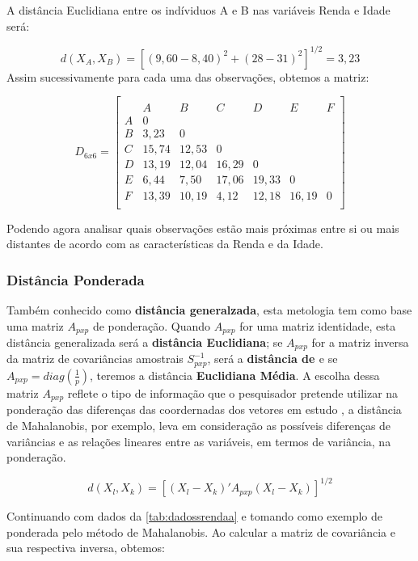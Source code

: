 \documentclass[
]{book}
\begin{document}
A distância Euclidiana entre os indíviduos A e B nas variáveis Renda e Idade será:

\[d(X_A,X_B)=[(9,60-8,40)^2+(28-31)^2]^{1/2}=3,23\]
Assim sucessivamente para cada uma das observações, obtemos a matriz:

\[D_{6x6}=\begin{bmatrix}\\
 &A&B&C&D&E&F \\
 A&0&&&&&\\
 B&3,23&0&&&&\\
 C & 15,74& 12,53&0&&&\\
 D& 13,19& 12,04& 16,29&0&&\\
 E& 6,44& 7,50& 17,06& 19,33&0&\\
 F& 13,39& 10,19& 4,12& 12,18& 16,19&0 \\
\end{bmatrix}\]

Podendo agora analisar quais observações estão mais próximas entre si ou mais distantes de acordo com as características da Renda e da Idade.

\hypertarget{distponderada}{%
\subsubsection{Distância Ponderada}\label{distponderada}}

Também conhecido como \textbf{distância generalzada}, esta metologia tem como base uma matriz \(A_{pxp}\) de ponderação. Quando \(A_{pxp}\) for uma matriz identidade, esta distância generalizada será a \textbf{distância Euclidiana}; se \(A_{pxp}\) for a matriz inversa da matriz de covariâncias amostrais \(S^{-1}_{pxp}\), será a \textbf{distância de \citet{mahalanobis1936generalized}} e se \(A_{pxp}=diag(\frac{1}{p})\), teremos a distância \textbf{Euclidiana Média}. A escolha dessa matriz \(A_{pxp}\) reflete o tipo de informação que o pesquisador pretende utilizar na ponderação das diferenças das coordernadas dos vetores em estudo \citep{mingoti2007analise}, a distância de Mahalanobis, por exemplo, leva em consideração as possíveis diferenças de variâncias e as relações lineares entre as variáveis, em termos de variância, na ponderação.

\begin{equation} 
  d(X_l,X_k)=[(X_l-X_k)'A_{pxp}(X_l - X_k)]^{1/2}
  \label{eq:distpond}
\end{equation}

Continuando com dados da \ref{tab:dadossrendaa} e tomando como exemplo de ponderada pelo método de Mahalanobis. Ao calcular a matriz de covariância e sua respectiva inversa, obtemos:
\end{document}
